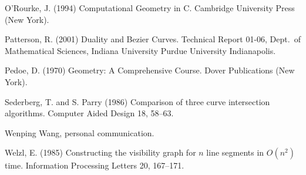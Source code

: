 \documentclass[12pt]{article}
\begin{document}
\begin{thebibliography}{99}
O'Rourke, J. (1994)
Computational Geometry in C.
Cambridge University Press (New York).

Patterson, R. (2001)
Duality and Bezier Curves.
Technical Report 01-06, Dept.\ of Mathematical Sciences,
Indiana University Purdue University Indianapolis.

Pedoe, D. (1970)
Geometry: A Comprehensive Course.
Dover Publications (New York).

Sederberg, T. and S. Parry (1986)
Comparison of three curve intersection algorithms.
Computer Aided Design 18, 58--63.

Wenping Wang, personal communication.

Welzl, E. (1985)
Constructing the visibility graph for $n$ line segments
in $O(n^2)$ time.
Information Processing Letters 20, 167--171.

\end{thebibliography}
\end{document}
